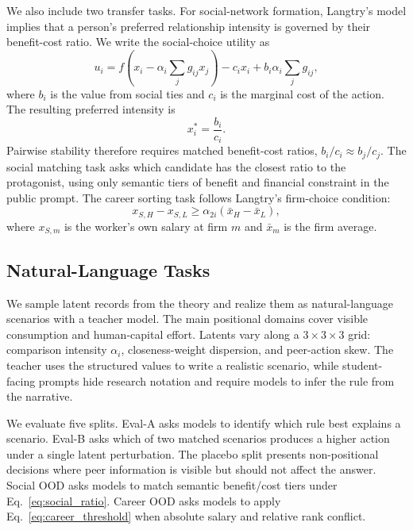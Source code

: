 \documentclass[11pt]{article}
\begin{document}
We also include two transfer tasks.
For social-network formation, Langtry's model implies that a person's preferred relationship intensity is governed by their benefit-cost ratio.
We write the social-choice utility as
\begin{equation}
u_i =
f\!\left(x_i-\alpha_i\sum_j g_{ij}x_j\right)
-c_ix_i+b_i\alpha_i\sum_j g_{ij},
\label{eq:social_utility}
\end{equation}
where $b_i$ is the value from social ties and $c_i$ is the marginal cost of the action.
The resulting preferred intensity is
\begin{equation}
x_i^*=\frac{b_i}{c_i}.
\label{eq:social_ratio}
\end{equation}
Pairwise stability therefore requires matched benefit-cost ratios, $b_i/c_i \approx b_j/c_j$.
The social matching task asks which candidate has the closest ratio to the protagonist, using only semantic tiers of benefit and financial constraint in the public prompt.
The career sorting task follows Langtry's firm-choice condition:
\begin{equation}
x_{S,H}-x_{S,L}\geq \alpha_{2i}(\bar{x}_H-\bar{x}_L),
\label{eq:career_threshold}
\end{equation}
where $x_{S,m}$ is the worker's own salary at firm $m$ and $\bar{x}_m$ is the firm average.

\subsection{Natural-Language Tasks}
We sample latent records from the theory and realize them as natural-language scenarios with a teacher model.
The main positional domains cover visible consumption and human-capital effort.
Latents vary along a $3\times3\times3$ grid: comparison intensity $\alpha_i$, closeness-weight dispersion, and peer-action skew.
The teacher uses the structured values to write a realistic scenario, while student-facing prompts hide research notation and require models to infer the rule from the narrative.

We evaluate five splits.
Eval-A asks models to identify which rule best explains a scenario.
Eval-B asks which of two matched scenarios produces a higher action under a single latent perturbation.
The placebo split presents non-positional decisions where peer information is visible but should not affect the answer.
Social OOD asks models to match semantic benefit/cost tiers under Eq.~\ref{eq:social_ratio}.
Career OOD asks models to apply Eq.~\ref{eq:career_threshold} when absolute salary and relative rank conflict.
\end{document}
